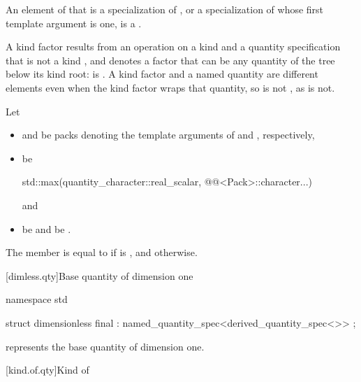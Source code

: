 \pnum
An element of  that is a specialization of ,
or a specialization of  whose first template argument is one,
is a .
\begin{note}
A kind factor results from an operation on a kind and a quantity specification that is not a kind
, and denotes a factor that can be any quantity of the tree below its kind root:
 is
.
A kind factor and a named quantity are different elements even when the kind factor wraps that quantity,
so  is not ,
as  is not.
\end{note}

\pnum
Let
\begin{itemize}
\item
{} and 
be packs denoting the template arguments of
 and , respectively,
\item
{} be
\begin{codeblock}
std::max({quantity_character::real_scalar, @@<Pack>::character...})
\end{codeblock}
and
\item
{} be  and
 be .
\end{itemize}
The member  is equal to
 if  is , and
 otherwise.

[dimless.qty]{Base quantity of dimension one}

\begin{codeblock}
namespace std {

struct dimensionless final : named_quantity_spec<derived_quantity_spec<>{}> {};

}
\end{codeblock}

\pnum
{} represents the base quantity of dimension one.

[kind.of.qty]{Kind of}

